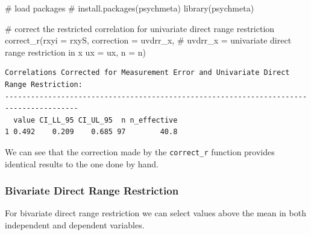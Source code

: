 \documentclass[
  letterpaper,
  DIV=11,
  numbers=noendperiod]{scrreprt}
\newenvironment{Shaded}{\begin{snugshade}}{\end{snugshade}}
\newcommand{\AttributeTok}[1]{\textcolor[rgb]{0.40,0.45,0.13}{#1}}
\newcommand{\CommentTok}[1]{\textcolor[rgb]{0.37,0.37,0.37}{#1}}
\newcommand{\FunctionTok}[1]{\textcolor[rgb]{0.28,0.35,0.67}{#1}}
\newcommand{\NormalTok}[1]{\textcolor[rgb]{0.00,0.23,0.31}{#1}}
\newcommand{\StringTok}[1]{\textcolor[rgb]{0.13,0.47,0.30}{#1}}
\begin{document}
\begin{Shaded}
\begin{Highlighting}[]
\CommentTok{\# load packages}
\CommentTok{\# install.packages(\textquotesingle{}psychmeta\textquotesingle{})}
\FunctionTok{library}\NormalTok{(psychmeta)}

\CommentTok{\# correct the restricted correlation for univariate direct range restriction}
\FunctionTok{correct\_r}\NormalTok{(}\AttributeTok{rxyi =}\NormalTok{ rxyS,}
          \AttributeTok{correction =} \StringTok{\textquotesingle{}uvdrr\_x\textquotesingle{}}\NormalTok{,  }\CommentTok{\# uvdrr\_x = univariate direct range restriction in x}
          \AttributeTok{ux =}\NormalTok{ ux,}
          \AttributeTok{n =}\NormalTok{ n)}
\end{Highlighting}
\end{Shaded}

\begin{verbatim}
Correlations Corrected for Measurement Error and Univariate Direct Range Restriction:
---------------------------------------------------------------------------------------
  value CI_LL_95 CI_UL_95  n n_effective
1 0.492    0.209    0.685 97        40.8
\end{verbatim}

We can see that the correction made by the \texttt{correct\_r} function
provides identical results to the one done by hand.

\hypertarget{bivariate-direct-range-restriction}{%
\subsubsection{Bivariate Direct Range
Restriction}\label{bivariate-direct-range-restriction}}

For bivariate direct range restriction we can select values above the
mean in both independent and dependent variables.
\end{document}
